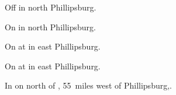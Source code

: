 

\begin{LocationList}

Off  in north Phillipsburg.

On  in north Phillipsburg.

On  at  in east Phillipsburg.

\Location{\GasStation \Gas \Rest}
On  at  in east Phillipsburg.

In  on  north of , 55~miles west of Phillipsburg,.

\end{LocationList}
